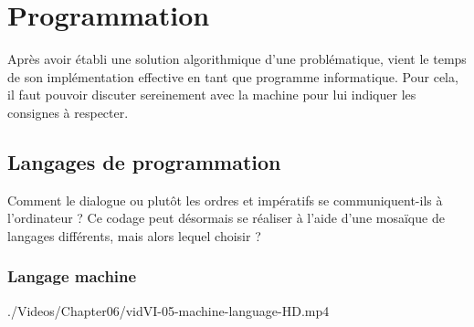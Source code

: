\section[Programmation]{Programmation}
\label{sec:VI.2}

Après avoir établi une solution algorithmique d'une problématique, vient le temps de son implémentation effective en tant que programme informatique. Pour cela, il faut pouvoir discuter sereinement avec la machine pour lui indiquer les consignes à respecter. 



\subsection[Langages de programmation]{Langages de programmation}
\label{sub:VI.2.1}

Comment le dialogue ou plutôt les ordres et impératifs se communi\-quent-ils à l'ordinateur ? Ce codage peut désormais se réaliser à l'aide d'une mosaïque de langages différents, mais alors lequel choisir ?

\subsubsection[Langage machine]{Langage machine}
\label{subsub:VI.2.1.1}

\begin{marginvideo}
		{./Videos/Chapter06/vidVI-05-machine-language-HD.mp4}%
\end{marginvideo}

